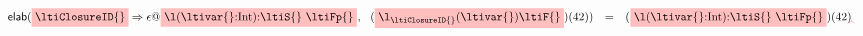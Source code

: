 \[
\begin{array}{llll}
\ltielimClosalign{\ltiClosureCacheEntry
                       {{\colorbox{pink}{\ltiClosureID{}}}{\tikz[overlay,remember picture] \node [] (b) {};}}
                       {{\ltiClosure{\ltiEmptyEnv}
                                   {\colorbox{pink}
                                         {\ltifunargrettype{\ltivar{}}
                                                           {\text{Int}}
                                                           {\ltiS{} \ }
                                                           {\ltiFp{}}}}}^
                        {\tikz[overlay,remember picture] \node [] (c) {};}}}
{\ \ \ltiappParens{{\tikz[overlay,remember picture] \node [] (a) {};}{\colorbox{pink}{\ltiufunelab{\ltiClosureID{}}{\ltivar{}}{\ltiF{}}}}}{\text{42}}}
{\ltiappParens{{}^{\tikz[overlay,remember picture] \node [] (d) {};}
               \colorbox{pink}{\ltifunargrettype{\ltivar{}}
                                                {\text{Int}}
                                                {\ltiS{} \ }
                                                {\ltiFp{}}}}
              {\text{42}}}
\begin{tikzpicture}[remember picture, overlay,
                  text width = 2.5cm ]
  \coordinate (Start1) at (a);
  \coordinate (End1) at (b);
  \coordinate (Start2) at (c);
  \coordinate (End2) at (d);
  \draw[pink,thick,solid,->](Start1.north) to [bend left] (End1.south);
  \draw[pink,thick,solid,->](Start2.north) to [bend left] (End2.south);
\end{tikzpicture} 
\end{array}
\]




